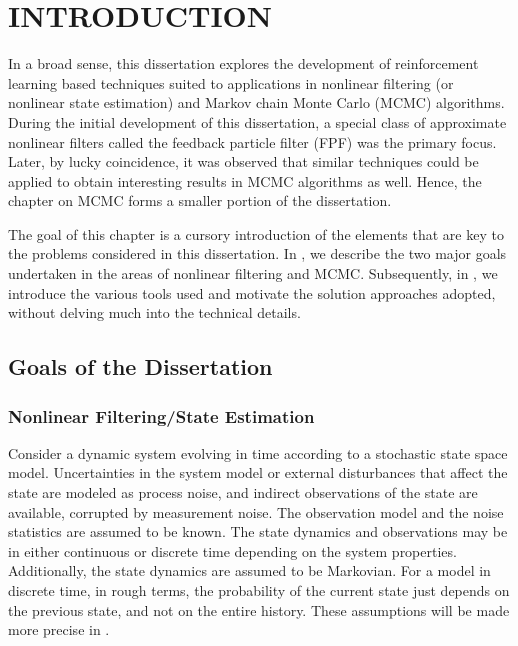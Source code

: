 \chapter{INTRODUCTION} 
\label{ch:intro}

In a broad sense, this dissertation explores the development of reinforcement learning based techniques suited to applications in nonlinear filtering (or nonlinear state estimation) and Markov chain Monte Carlo (MCMC) algorithms. During the initial development of this dissertation, a special class of approximate nonlinear filters called the feedback particle filter (FPF) was the primary focus. Later, by lucky coincidence, it was observed that similar techniques could be applied to obtain interesting results in MCMC algorithms as well. Hence, the chapter on MCMC forms a smaller portion of the dissertation. 

The goal of this chapter is a cursory introduction of the elements that are key to the problems considered in this dissertation. In , we describe the two major goals undertaken in the areas of nonlinear filtering and MCMC. Subsequently, in , we introduce the various tools used and motivate the solution approaches adopted, without delving much into the technical details. 
\section{Goals of the Dissertation}
\label{s:goals}
\subsection{Nonlinear Filtering/State Estimation}
\label{s:filtering}
Consider a dynamic system evolving in time according to a stochastic state space model. Uncertainties in the system model or external disturbances that affect the state are modeled as process noise, and indirect observations of the state are available, corrupted by measurement noise. The observation model and the noise statistics are assumed to be known. The state dynamics and observations may be in either continuous or discrete time depending on the system properties. Additionally, the state dynamics are assumed to be Markovian. For a model in discrete time, in rough terms, the probability of the current state just depends on the previous state, and not on the entire history. These assumptions will be made more precise in . 

